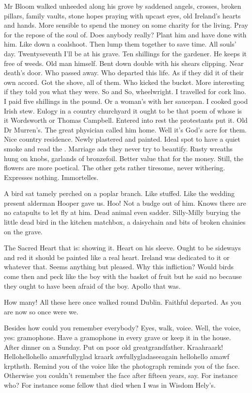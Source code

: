 Mr Bloom walked unheeded along his grove
by saddened angels, crosses, broken pillars,
family vaults,
stone hopes praying with upcast eyes,
old Ireland's hearts and hands.
More sensible to spend the money on some charity for the living.
Pray for the repose of the soul of.
Does anybody really?
Plant him and have done with him.
Like down a coalshoot.
Then lump them together to save time.
All souls' day.
Twentyseventh I'll be at his grave.
Ten shillings for the gardener.
He keeps it free of weeds.
Old man himself.
Bent down double with his shears clipping.
Near death's door.
Who passed away.
Who departed this life.
As if they did it of their own accord.
Got the shove, all of them.
Who kicked the bucket.
More interesting if they told you what they were.
So and So, wheelwright.
I travelled for cork lino.
I paid five shillings in the pound.
Or a woman's with her saucepan.
I cooked good Irish stew.
Eulogy in a country churchyard it ought to be
that poem of whose is it Wordsworth or Thomas Campbell.
Entered into rest the protestants put it.
Old Dr Murren's.
The great physician called him home.
Well it's God's acre for them.
Nice country residence.
Newly plastered and painted.
Ideal spot to have a quiet smoke and read the .
Marriage ads they never try to beautify.
Rusty wreaths hung on knobs, garlands of bronzefoil.
Better value that for the money.
Still, the flowers are more poetical.
The other gets rather tiresome, never withering.
Expresses nothing.
Immortelles.

A bird sat tamely perched on a poplar branch.
Like stuffed.
Like the wedding present alderman Hooper gave us.
Hoo!
Not a budge out of him.
Knows there are no catapults to let fly at him.
Dead animal even sadder.
Silly-Milly burying the little dead bird in the kitchen matchbox,
a daisychain and bits of broken chainies on the grave.

The Sacred Heart that is:
showing it.
Heart on his sleeve.
Ought to be sideways and red
it should be painted like a real heart.
Ireland was dedicated to it or whatever that.
Seems anything but pleased.
Why this infliction?
Would birds come then and peck
like the boy with the basket of fruit
but he said no
because they ought to have been afraid of the boy.
Apollo that was.

How many!
All these here once walked round Dublin.
Faithful departed.
As you are now so once were we.

Besides how could you remember everybody?
Eyes, walk, voice.
Well, the voice, yes:
gramophone.
Have a gramophone in every grave or keep it in the house.
After dinner on a Sunday.
Put on poor old greatgrandfather.
Kraahraark!
Hellohellohello amawfullyglad kraark awfullygladaseeagain hellohello amawf krpthsth.
Remind you of the voice
like the photograph reminds you of the face.
Otherwise you couldn't remember the face after fifteen years, say.
For instance who?
For instance some fellow that died
when I was in Wisdom Hely's.

